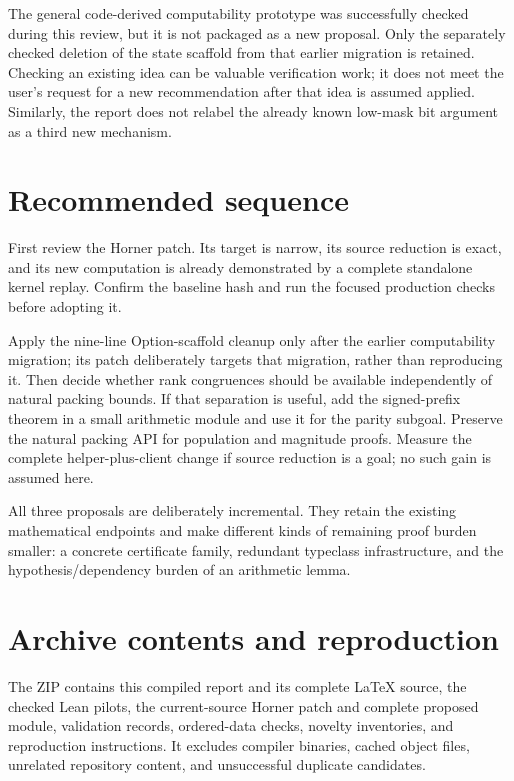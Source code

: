 \documentclass[11pt,a4paper]{article}
\begin{document}
The general code-derived computability prototype was successfully checked during this review, but it is not packaged as a new proposal. Only the separately checked deletion of the state scaffold from that earlier migration is retained. Checking an existing idea can be valuable verification work; it does not meet the user's request for a new recommendation after that idea is assumed applied. Similarly, the report does not relabel the already known low-mask bit argument as a third new mechanism.

\section{Recommended sequence}

First review the Horner patch. Its target is narrow, its source reduction is exact, and its new computation is already demonstrated by a complete standalone kernel replay. Confirm the baseline hash and run the focused production checks before adopting it.

Apply the nine-line Option-scaffold cleanup only after the earlier computability migration; its patch deliberately targets that migration, rather than reproducing it. Then decide whether rank congruences should be available independently of natural packing bounds. If that separation is useful, add the signed-prefix theorem in a small arithmetic module and use it for the parity subgoal. Preserve the natural packing API for population and magnitude proofs. Measure the complete helper-plus-client change if source reduction is a goal; no such gain is assumed here.

All three proposals are deliberately incremental. They retain the existing mathematical endpoints and make different kinds of remaining proof burden smaller: a concrete certificate family, redundant typeclass infrastructure, and the hypothesis/dependency burden of an arithmetic lemma.

\appendix
\section{Archive contents and reproduction}

The ZIP contains this compiled report and its complete LaTeX source, the checked Lean pilots, the current-source Horner patch and complete proposed module, validation records, ordered-data checks, novelty inventories, and reproduction instructions. It excludes compiler binaries, cached object files, unrelated repository content, and unsuccessful duplicate candidates.
\end{document}
